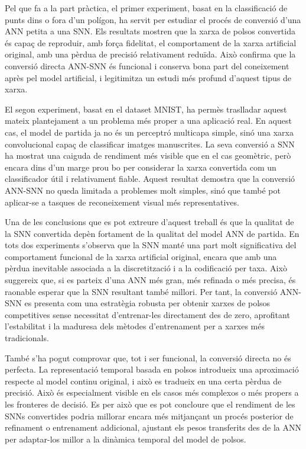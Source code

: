 \documentclass[a4paper,11pt, titlepage, twoside]{article}
\begin{document}
Pel que fa a la part pràctica, el primer experiment, basat en la classificació de punts dins o fora d’un polígon, ha servit per estudiar el procés de conversió d’una ANN petita a una SNN. Els resultats mostren que la xarxa de polsos convertida és capaç de reproduir, amb força fidelitat, el comportament de la xarxa artificial original, amb una pèrdua de precisió relativament reduïda. Això confirma que la conversió directa ANN-SNN és funcional i conserva bona part del coneixement après pel model artificial, i legitimitza un estudi més profund d'aquest tipus de xarxa.

El segon experiment, basat en el dataset MNIST, ha permès traslladar aquest mateix plantejament a un problema més proper a una aplicació real. En aquest cas, el model de partida ja no és un perceptró multicapa simple, sinó una xarxa convolucional capaç de classificar imatges manuscrites. La seva conversió a SNN ha mostrat una caiguda de rendiment més visible que en el cas geomètric, però encara dins d’un marge prou bo per considerar la xarxa convertida com un classificador útil i relativament fiable. Aquest resultat demostra que la conversió ANN-SNN no queda limitada a problemes molt simples, sinó que també pot aplicar-se a tasques de reconeixement visual més representatives.

Una de les conclusions que es pot extreure d'aquest treball és que la qualitat de la SNN convertida depèn fortament de la qualitat del model ANN de partida. En tots dos experiments s’observa que la SNN manté una part molt significativa del comportament funcional de la xarxa artificial original, encara que amb una pèrdua inevitable associada a la discretització i a la codificació per taxa. Això suggereix que, si es parteix d’una ANN més gran, més refinada o més precisa, és raonable esperar que la SNN resultant també millori. Per tant, la conversió ANN-SNN es presenta com una estratègia robusta per obtenir xarxes de polsos competitives sense necessitat d’entrenar-les directament des de zero, aprofitant l’estabilitat i la maduresa dels mètodes d’entrenament per a xarxes més tradicionals.

També s’ha pogut comprovar que, tot i ser funcional, la conversió directa no és perfecta. La representació temporal basada en polsos introdueix una aproximació respecte al model continu original, i això es tradueix en una certa pèrdua de precisió. Això és especialment visible en els casos més complexos o més propers a les fronteres de decisió. Es per això que es pot concloure que el rendiment de les SNNs convertides podria millorar encara més mitjançant un procés posterior de refinament o entrenament addicional, ajustant els pesos transferits des de la ANN per adaptar-los millor a la dinàmica temporal del model de polsos.
\end{document}
